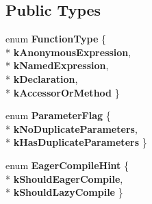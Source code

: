 \subsection*{Public Types}
\begin{DoxyCompactItemize}
\item 
enum {\bfseries Function\+Type} \{ \\*
{\bfseries k\+Anonymous\+Expression}, 
\\*
{\bfseries k\+Named\+Expression}, 
\\*
{\bfseries k\+Declaration}, 
\\*
{\bfseries k\+Accessor\+Or\+Method}
 \}\hypertarget{classv8_1_1internal_1_1_function_literal_a8886eb91113bf0a173f28930847f8709}{}\label{classv8_1_1internal_1_1_function_literal_a8886eb91113bf0a173f28930847f8709}

\item 
enum {\bfseries Parameter\+Flag} \{ \\*
{\bfseries k\+No\+Duplicate\+Parameters}, 
\\*
{\bfseries k\+Has\+Duplicate\+Parameters}
 \}\hypertarget{classv8_1_1internal_1_1_function_literal_a9b78335839e8c3dd2d809f33cceddec2}{}\label{classv8_1_1internal_1_1_function_literal_a9b78335839e8c3dd2d809f33cceddec2}

\item 
enum {\bfseries Eager\+Compile\+Hint} \{ \\*
{\bfseries k\+Should\+Eager\+Compile}, 
\\*
{\bfseries k\+Should\+Lazy\+Compile}
 \}\hypertarget{classv8_1_1internal_1_1_function_literal_ae1d69954eaf51a68c8831a75299c7cb6}{}\label{classv8_1_1internal_1_1_function_literal_ae1d69954eaf51a68c8831a75299c7cb6}

\end{DoxyCompactItemize}

